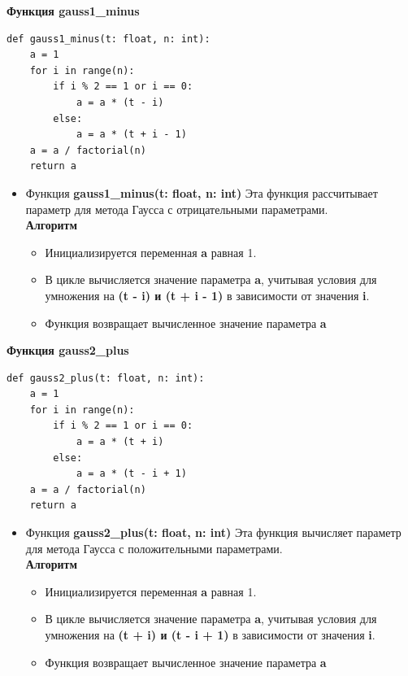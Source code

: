 \documentclass{article}
\begin{document}
\vspace{5\baselineskip}


\textbf{\large{Функция gauss1\_minus}}
\begin{lstlisting}
def gauss1_minus(t: float, n: int):
    a = 1
    for i in range(n):
        if i % 2 == 1 or i == 0:
            a = a * (t - i)
        else:
            a = a * (t + i - 1)
    a = a / factorial(n)
    return a

\end{lstlisting}
\begin{itemize}
\item Функция \textbf{gauss1\_minus(t: float, n: int)} 
Эта функция рассчитывает параметр для метода Гаусса с отрицательными параметрами.\\
\textbf{Алгоритм}
\begin{itemize}
    \item Инициализируется переменная \textbf{a} равная 1.
    \item В цикле вычисляется значение параметра \textbf{a}, учитывая условия для умножения на \textbf{(t - i) и (t + i - 1)} в зависимости от значения \textbf{i}.
    \item Функция возвращает вычисленное значение параметра \textbf{a}

\end{itemize}
\end{itemize}

\textbf{\large{Функция gauss2\_plus}}
\begin{lstlisting}
def gauss2_plus(t: float, n: int):
    a = 1
    for i in range(n):
        if i % 2 == 1 or i == 0:
            a = a * (t + i)
        else:
            a = a * (t - i + 1)
    a = a / factorial(n)
    return a
\end{lstlisting}

\begin{itemize}
\item Функция \textbf{gauss2\_plus(t: float, n: int)} 
Эта функция вычисляет параметр для метода Гаусса с положительными параметрами.\\
\textbf{Алгоритм}
\begin{itemize}
    \item Инициализируется переменная \textbf{a} равная 1.
    \item В цикле вычисляется значение параметра \textbf{a}, учитывая условия для умножения на \textbf{(t + i) и (t - i + 1)} в зависимости от значения \textbf{i}.
    \item Функция возвращает вычисленное значение параметра \textbf{a}

\end{itemize}
\end{itemize}
\end{document}
